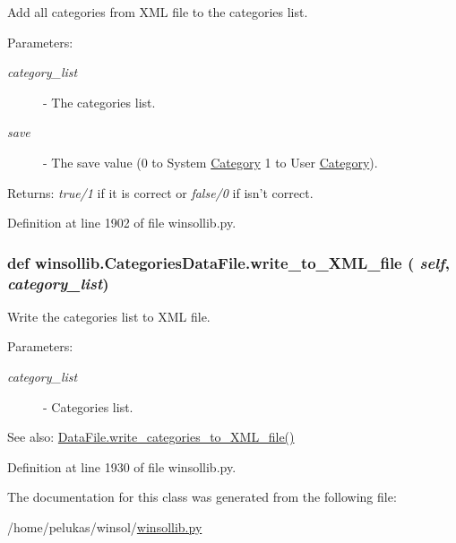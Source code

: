 Add all categories from XML file to the categories list. 

\begin{Desc}
\item[Parameters:]
\begin{description}
\item[{\em category\_\-list}]- The categories list. \item[{\em save}]- The save value (0 to System \hyperlink{classwinsollib_1_1Category}{Category} 1 to User \hyperlink{classwinsollib_1_1Category}{Category}). \end{description}
\end{Desc}
\begin{Desc}
\item[Returns:]{\em true/1\/} if it is correct or {\em false/0\/} if isn't correct. \end{Desc}


Definition at line 1902 of file winsollib.py.\hypertarget{classwinsollib_1_1CategoriesDataFile_cad84f36c2d05d1fee6dfae84165da0a}{
\subsubsection[write\_\-to\_\-XML\_\-file]{\setlength{\rightskip}{0pt plus 5cm}def winsollib.Categories\-Data\-File.write\_\-to\_\-XML\_\-file ( {\em self},  {\em category\_\-list})}}
\label{classwinsollib_1_1CategoriesDataFile_cad84f36c2d05d1fee6dfae84165da0a}


Write the categories list to XML file. 

\begin{Desc}
\item[Parameters:]
\begin{description}
\item[{\em category\_\-list}]- Categories list.\end{description}
\end{Desc}
\begin{Desc}
\item[See also:]\hyperlink{classwinsollib_1_1DataFile_43018e66b71925ff9050c17e733b7308}{Data\-File.write\_\-categories\_\-to\_\-XML\_\-file()} \end{Desc}


Definition at line 1930 of file winsollib.py.

The documentation for this class was generated from the following file:\begin{CompactItemize}
\item 
/home/pelukas/winsol/\hyperlink{winsollib_8py}{winsollib.py}\end{CompactItemize}
